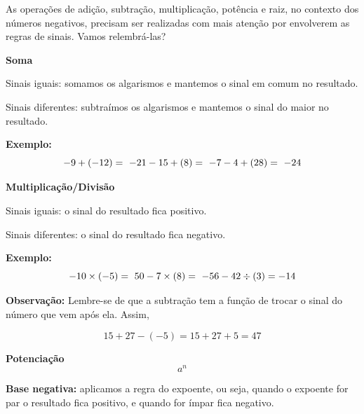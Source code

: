 
As operações de adição, subtração, multiplicação, potência e raiz, no
contexto dos números negativos, precisam ser realizadas com mais atenção
por envolverem as regras de sinais. Vamos relembrá-las?

\textbf{Soma}

Sinais iguais: somamos os algarismos e mantemos o sinal em comum no
resultado.

Sinais diferentes: subtraímos os algarismos e mantemos o sinal do maior
no resultado.

\textbf{Exemplo:} $$- 9 + \left( - 12 \right) = \  - 21\\
- 15 + \left( 8 \right) = \  - 7\\
- 4 + \left( 28 \right) = \  - 24\\$$

\textbf{Multiplicação/Divisão}

Sinais iguais: o sinal do resultado fica positivo.

Sinais diferentes: o sinal do resultado fica negativo.

\textbf{Exemplo:} $$- 10 \times \left( - 5 \right) = \ 50\\
- 7 \times \left( 8 \right) = \ - 56\\
- 42 \div \left( 3 \right) = - 14\\$$

\textbf{Observação:} Lembre-se de que a subtração tem a função de trocar
o sinal do número que vem após ela. Assim,

$$15 + 27 - \left( - 5 \right) = 15 + 27 + 5 = 47$$

\textbf{Potenciação} $$a^{n}$$


\textbf{Base negativa:} aplicamos a regra do expoente, ou seja, quando o
expoente for par o resultado fica positivo, e quando for ímpar fica
negativo.

